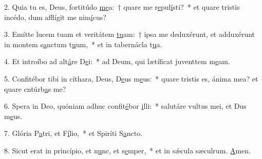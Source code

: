 2. Quia tu es, Deus, fortitúdo \uline{me}a:~† quare me r\uline{e}pul\uline{í}sti?~* et quare tristis incédo, dum afflígit me nim\uline{í}cus?\par 
3. Emítte lucem tuam et veritátem \uline{tu}am:~† ipsa me deduxérunt, et adduxérunt in montem s\uline{a}nctum t\uline{u}um,~* et in tabernácla t\uline{u}a.\par 
4. Et introíbo ad alt\uline{á}re D\uline{e}i:~* ad Deum, qui lætíficat juventtem m\uline{e}am.\par 
5. Confitébor tibi in cíthara, Deus, D\uline{e}us m\uline{e}us:~* quare tristis es, ánima mea? et quare cntúrb\uline{a}s me?\par 
6. Spera in Deo, quóniam adhuc confit\uline{é}bor \uline{i}lli:~* salutáre vultus mei, et Dus m\uline{e}us.\par 
7. Glória P\uline{a}tri, et F\uline{í}lio,~* et Spiríti S\uline{a}ncto.\par 
8. Sicut erat in princípio, et n\uline{u}nc, et s\uline{e}mper,~* et in sǽcula sæculrum. \uline{A}men.\par 
